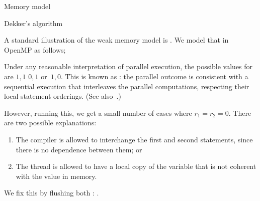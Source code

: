  {Memory model}
\label{sec:omp-memory}

 {Dekker's algorithm}

A standard illustration of the weak memory model is
.
We model that in OpenMP as follows;

Under any reasonable interpretation of parallel execution,
the possible values for  are $1,1$ $0,1$ or~$1,0$.
This is known as :
the parallel outcome is consistent with a sequential execution that
interleaves the parallel computations, respecting their local statement orderings.
(See also~.)

However, running this, we get a small number of cases where $r_1=r_2=0$.
There are two possible explanations:
\begin{enumerate}
\item The compiler is allowed to interchange the first and second statements,
  since there is no dependence between them; or
\item The thread is allowed to have a local copy of the variable
  that is not coherent with the value in memory.
\end{enumerate}

We fix this by flushing both :
.


